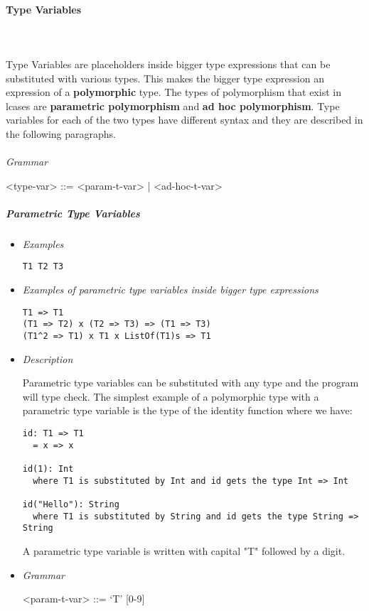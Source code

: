 \documentclass{article}
\begin{document}
\paragraph{Type Variables}
\mbox{}\\\\
Type Variables are placeholders inside bigger type expressions that can be
substituted with various types. This makes the bigger type expression an
expression of a \textbf{polymorphic} type. The types of polymorphism that exist
in lcases are \textbf{parametric polymorphism} and \textbf{ad hoc
polymorphism}. Type variables for each of the two types have different syntax
and they are described in the following paragraphs.
\\\\
\textit{Grammar}
\begin{grammar}
<type-var> ::= <param-t-var> | <ad-hoc-t-var> \\ 
\end{grammar}
\subparagraph{Parametric Type Variables}

\begin{itemize}
\item \textit{Examples}
\begin{verbatim}
T1 T2 T3 
\end{verbatim}

\item \textit{Examples of parametric type variables inside bigger type expressions}
\begin{verbatim}
T1 => T1
(T1 => T2) x (T2 => T3) => (T1 => T3)
(T1^2 => T1) x T1 x ListOf(T1)s => T1
\end{verbatim}

\item \textit{Description}

Parametric type variables can be substituted with any type and the program will
type check.  The simplest example of a polymorphic type with a parametric type
variable is the type of the identity function where we have:
\begin{verbatim}
id: T1 => T1
  = x => x

id(1): Int
  where T1 is substituted by Int and id gets the type Int => Int

id("Hello"): String
  where T1 is substituted by String and id gets the type String => String
\end{verbatim}

A parametric type variable is written with capital "T" followed by a digit.

\item \textit{Grammar}
\begin{grammar}
<param-t-var> ::= `T' [0-9] \\ 
\end{grammar}
\end{itemize}
\end{document}
